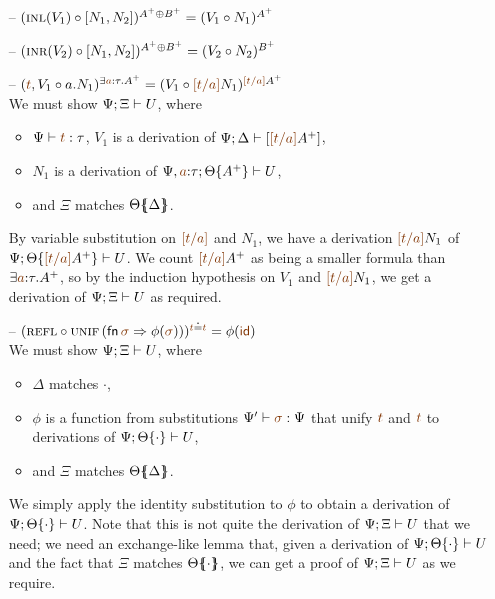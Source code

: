 \begin{itemize}
\item[--] $({\textsc{inl}({V_1})} \circ {[{N_1},{N_2}]})^{A^+ \oplus B^+} 
           = ({V_1} \circ {N_1})^{A^+}$

\item[--] $({\textsc{inr}({V_2})} \circ {[{N_1},{N_2}]})^{A^+ \oplus B^+} 
           = ({V_2} \circ {N_2})^{B^+}$

\newpage
\item[--] $(\subst{\texistsr{\lf{t}}{V_1}}{\texistsl{a}{N_1}})^{\exists \lf{a}{:}\tau.A^+}
           = (\subst{V_1}{\lf{[t/a]}N_1})^{\lf{[t/a]}A^+}$ \smallskip\\
  We must show ${\Psi};{\Xi} \vdash {U} \mathstrut$, where
  \begin{itemize}
  \item $\Psi \vdash \lf{t} : \tau$, $V_1$ is a derivation of 
     $\foc{\Psi}{\Delta}{[\lf{[t/a]}A^+]}$,
  \item 
     $N_1$ is a derivation of 
     $\foc{\Psi, \lf{a}{:}\tau}{\tackon{\Theta}{A^+}}{U}$,
  \item and $\Xi$ matches ${\Theta}\mbox{$\{\hspace{-4pt}\{$}{\Delta}\mbox{$\}\hspace{-4pt}\}$}$.
  \end{itemize}
  By variable
  substitution on $\lf{[t/a]}$ and $N_1$, we have a derivation $\lf{[t/a]}N_1$ of
  $\foc{\Psi}{\tackon{\Theta}{\lf{[t/a]}A^+}}{U}$.  We count $\lf{[t/a]}A^+$ as
  being a smaller formula than $\exists \lf{a}{:}\tau.A^+$, so by the
  induction hypothesis on $V_1$ and $\lf{[t/a]}N_1$, we get a derivation of
  ${\Psi};{\Xi} \vdash {U} \mathstrut$ as required. \smallskip

\item[--] $(\subst{\tunifr}{\textsc{unif}\,({\sf fn}\,\lf{\sigma} \Rightarrow \phi(\lf\sigma))})^{\lf t \doteq \lf t} = \phi(\lf{\sf id})$\smallskip\\
  We must show ${\Psi};{\Xi} \vdash {U} \mathstrut$, where
  \begin{itemize}
  \item $\Delta$ matches $\cdot$,
  \item $\phi$ is a function from substitutions $\Psi' \vdash \lf\sigma : \Psi$
     that unify $\lf t$ and $\lf t$ to derivations of 
     ${\Psi};{{\Theta}\{{\cdot}\}} \vdash {U} \mathstrut$,
  \item and $\Xi$ matches ${\Theta}\mbox{$\{\hspace{-4pt}\{$}{\Delta}\mbox{$\}\hspace{-4pt}\}$}$.
  \end{itemize}
  We simply apply the identity substitution to $\phi$
  to obtain a derivation of ${\Psi};{{\Theta}\{{\cdot}\}} \vdash {U} \mathstrut$.
  Note that this is not quite the derivation of 
  ${\Psi};{\Xi} \vdash {U} \mathstrut$ that we need; we need an exchange-like lemma that, 
  given a derivation of ${\Psi};{{\Theta}\{{\cdot}\}} \vdash {U} \mathstrut$
  and the fact that $\Xi$ matches ${\Theta}\mbox{$\{\hspace{-4pt}\{$}{\cdot}\mbox{$\}\hspace{-4pt}\}$}$,
  we can get a proof of ${\Psi};{\Xi} \vdash {U} \mathstrut$ as we require.

\end{itemize}

